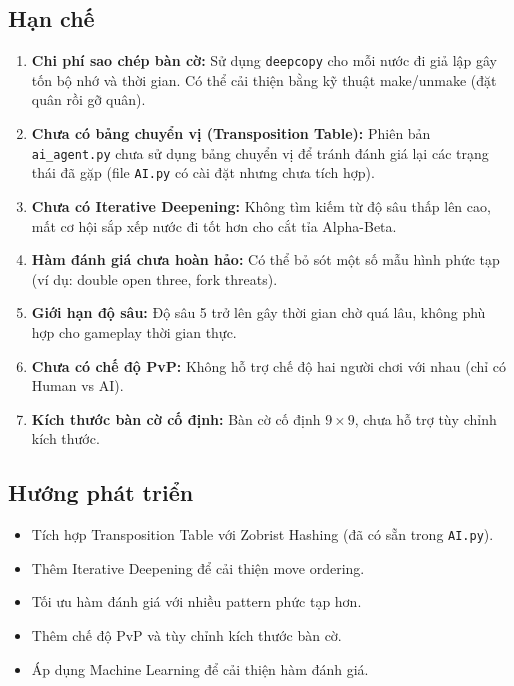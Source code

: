 \documentclass[12pt,a4paper]{article}
\begin{document}
\subsection{Hạn chế}

\begin{enumerate}
    \item \textbf{Chi phí sao chép bàn cờ:} Sử dụng \texttt{deepcopy} cho mỗi nước đi giả lập gây tốn bộ nhớ và thời gian. Có thể cải thiện bằng kỹ thuật make/unmake (đặt quân rồi gỡ quân).

    \item \textbf{Chưa có bảng chuyển vị (Transposition Table):} Phiên bản \texttt{ai\_agent.py} chưa sử dụng bảng chuyển vị để tránh đánh giá lại các trạng thái đã gặp (file \texttt{AI.py} có cài đặt nhưng chưa tích hợp).

    \item \textbf{Chưa có Iterative Deepening:} Không tìm kiếm từ độ sâu thấp lên cao, mất cơ hội sắp xếp nước đi tốt hơn cho cắt tỉa Alpha-Beta.

    \item \textbf{Hàm đánh giá chưa hoàn hảo:} Có thể bỏ sót một số mẫu hình phức tạp (ví dụ: double open three, fork threats).

    \item \textbf{Giới hạn độ sâu:} Độ sâu 5 trở lên gây thời gian chờ quá lâu, không phù hợp cho gameplay thời gian thực.

    \item \textbf{Chưa có chế độ PvP:} Không hỗ trợ chế độ hai người chơi với nhau (chỉ có Human vs AI).

    \item \textbf{Kích thước bàn cờ cố định:} Bàn cờ cố định $9 \times 9$, chưa hỗ trợ tùy chỉnh kích thước.
\end{enumerate}

\subsection{Hướng phát triển}

\begin{itemize}
    \item Tích hợp Transposition Table với Zobrist Hashing (đã có sẵn trong \texttt{AI.py}).
    \item Thêm Iterative Deepening để cải thiện move ordering.
    \item Tối ưu hàm đánh giá với nhiều pattern phức tạp hơn.
    \item Thêm chế độ PvP và tùy chỉnh kích thước bàn cờ.
    \item Áp dụng Machine Learning để cải thiện hàm đánh giá.
\end{itemize}
\end{document}
